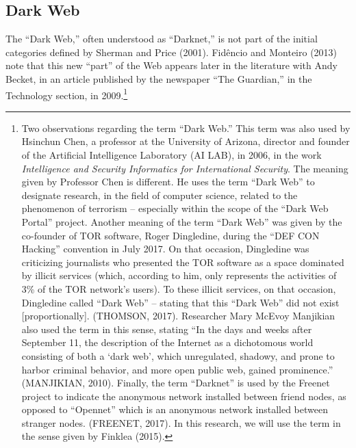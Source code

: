 \subsection{Dark Web}

The ``Dark Web,'' often understood as ``Darknet,'' is not part of the initial categories defined by Sherman and Price (2001). Fid\^{e}ncio and Monteiro (2013) note that this new ``part'' of the Web appears later in the literature with Andy Becket, in an article published by the newspaper ``The Guardian,'' in the Technology section, in 2009.\footnote{Two observations regarding the term ``Dark Web.'' This term was also used by Hsinchun Chen, a professor at the University of Arizona, director and founder of the Artificial Intelligence Laboratory (AI LAB), in 2006, in the work \textit{Intelligence and Security Informatics for International Security}. The meaning given by Professor Chen is different. He uses the term ``Dark Web'' to designate research, in the field of computer science, related to the phenomenon of terrorism -- especially within the scope of the ``Dark Web Portal'' project. Another meaning of the term ``Dark Web'' was given by the co-founder of TOR software, Roger Dingledine, during the ``DEF CON Hacking'' convention in July 2017. On that occasion, Dingledine was criticizing journalists who presented the TOR software as a space dominated by illicit services (which, according to him, only represents the activities of 3\% of the TOR network's users). To these illicit services, on that occasion, Dingledine called ``Dark Web'' -- stating that this ``Dark Web'' did not exist {[}proportionally{]}. (THOMSON, 2017). Researcher Mary McEvoy Manjikian also used the term in this sense, stating ``In the days and weeks after September 11, the description of the Internet as a dichotomous world consisting of both a `dark web', which unregulated, shadowy, and prone to harbor criminal behavior, and more open public web, gained prominence.'' (MANJIKIAN, 2010). Finally, the term ``Darknet'' is used by the Freenet project to indicate the anonymous network installed between friend nodes, as opposed to ``Opennet'' which is an anonymous network installed between stranger nodes. (FREENET, 2017). In this research, we will use the term in the sense given by Finklea (2015).}

